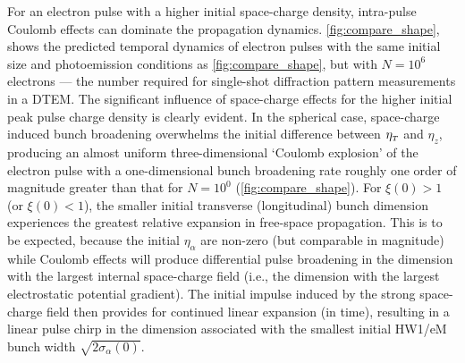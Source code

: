 For an electron pulse with a higher initial space-charge density, intra-pulse Coulomb effects can dominate the propagation dynamics.
\ref{fig:compare_shape}, shows the predicted temporal dynamics of electron pulses with the same initial size and photoemission conditions as \ref{fig:compare_shape}, but with $ N = 10^{6} $ electrons --- the number required for single-shot diffraction pattern measurements in a DTEM.\cite{berger_dc_2009,armstrong_practical_2007}
The significant influence of space-charge effects for the higher initial peak pulse charge density is clearly evident.
In the spherical case, space-charge induced bunch broadening overwhelms the initial difference between $\eta_{{\scriptscriptstyle T}}$ and $\eta_{z}$, producing an almost uniform three-dimensional `Coulomb explosion' of the electron pulse with a one-dimensional bunch broadening rate roughly one order of magnitude greater than that for $ N = 10^{0} $ (\ref{fig:compare_shape}).
For $ \xi (0) > 1 $ (or $ \xi (0) < 1 $), the smaller initial transverse (longitudinal) bunch dimension experiences the greatest relative expansion in free-space propagation. This is to be expected, because the initial $\eta_{\alpha}$ are non-zero (but comparable in magnitude) while Coulomb effects will produce differential pulse broadening in the dimension with the largest internal space-charge field (i.e., the dimension with the largest electrostatic potential gradient).
The initial impulse induced by the strong space-charge field then provides for continued linear expansion (in time), resulting in a linear pulse chirp in the dimension associated with the smallest initial HW1/eM bunch width\cite{michalik_analytic_2006,berger_dc_2009} $ \sqrt{ 2 \sigma_{\alpha} (0) } $.

